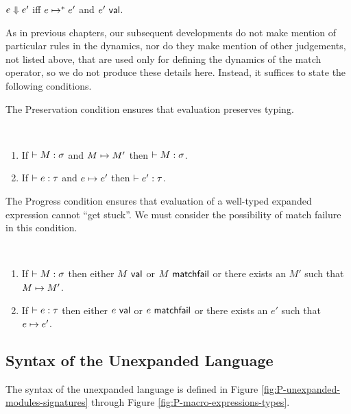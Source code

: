 \begingroup
\def\thetheorem{\ref{defn:evaluation-P}}
\begin{definition}[Evaluation] $e \Downarrow e'$ iff $e \mapsto^{*} e'$ and $e'~\mathsf{val}$. \end{definition}
\endgroup

As in previous chapters, our subsequent developments do not make mention of particular rules in the dynamics, nor do they make mention of other judgements, not listed above, that are used only for defining the dynamics of the match operator, so we do not produce these details here. Instead, it suffices to state the following conditions.

The Preservation condition ensures that evaluation preserves typing.
\begingroup
\def\thetheorem{\ref{condition:preservation-P}}
\begin{condition}[Preservation] ~
\begin{enumerate}
\item If $\vdash M : \sigma$ and $M \mapsto M'$ then $\vdash M : \sigma$.
\item If $\vdash e : \tau$ and $e \mapsto e'$ then $\vdash e' : \tau$.
\end{enumerate}
\end{condition}
\endgroup

The Progress condition ensures that evaluation of a well-typed expanded expression cannot ``get stuck''. We must consider the possibility of match failure in this condition.
\begingroup
\def\thetheorem{\ref{condition:progress-P}}
\begin{condition}[Progress] ~
\begin{enumerate}
\item If $\vdash M : \sigma$ then either $M~\mathsf{val}$ or $M~\mathsf{matchfail}$ or there exists an $M'$ such that $M \mapsto M'$.
\item If $\vdash e : \tau$ then either $e~\mathsf{val}$ or $e~\mathsf{matchfail}$ or there exists an $e'$ such that $e \mapsto e'$.
\end{enumerate}
\end{condition}
\endgroup

\subsection{Syntax of the Unexpanded Language}
The syntax of the unexpanded language is defined in Figure \ref{fig:P-unexpanded-modules-signatures} through Figure \ref{fig:P-macro-expressions-types}.

